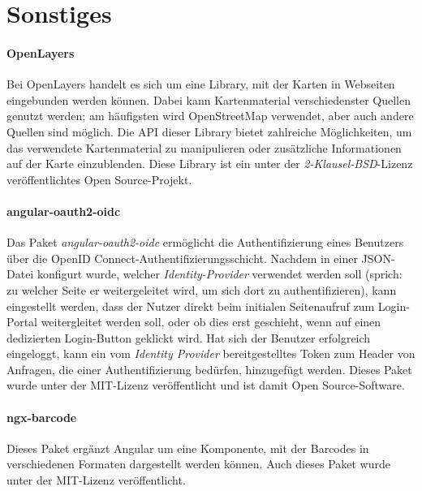 \section{Sonstiges}
\label{sec:technologies:other}

\paragraph*{OpenLayers}
\label{sec:technologies:ol}
Bei OpenLayers handelt es sich um eine Library, mit der Karten in Webseiten eingebunden werden können. Dabei kann Kartenmaterial verschiedenster Quellen genutzt werden; am häufigsten wird OpenStreetMap verwendet, aber auch andere Quellen sind möglich. Die \acs{API} dieser Library bietet zahlreiche Möglichkeiten, um das verwendete Kartenmaterial zu manipulieren oder zusätzliche Informationen auf der Karte einzublenden. Diese Library ist ein unter der \textit{2-Klausel-BSD}-Lizenz veröffentlichtes Open Source-Projekt\cite{OpenLayers}.

\paragraph*{angular-oauth2-oidc}
\label{sec:technologies:oidc}
Das Paket \textit{angular-oauth2-oidc} ermöglicht die Authentifizierung eines Benutzers über die OpenID Connect-Authentifizierungsschicht. Nachdem in einer \acs{JSON}-Datei konfigurt wurde, welcher \textit{Identity-Provider} verwendet werden soll (sprich: zu welcher Seite er weitergeleitet wird, um sich dort zu authentifizieren), kann eingestellt werden, dass der Nutzer direkt beim initialen Seitenaufruf zum Login-Portal weitergleitet werden soll, oder ob dies erst geschieht, wenn auf einen dedizierten Login-Button geklickt wird. Hat sich der Benutzer erfolgreich eingeloggt, kann ein vom \textit{Identity Provider} bereitgestelltes Token zum Header von Anfragen, die einer Authentifizierung bedürfen, hinzugefügt werden. Dieses Paket wurde unter der MIT-Lizenz veröffentlicht und ist damit Open Source-Software\cite{oidc}.

\paragraph*{ngx-barcode}
\label{sec:technologies:barcode}
Dieses Paket ergänzt Angular um eine Komponente, mit der Barcodes in verschiedenen Formaten dargestellt werden können. Auch dieses Paket wurde unter der MIT-Lizenz veröffentlicht\cite{barcode}.

